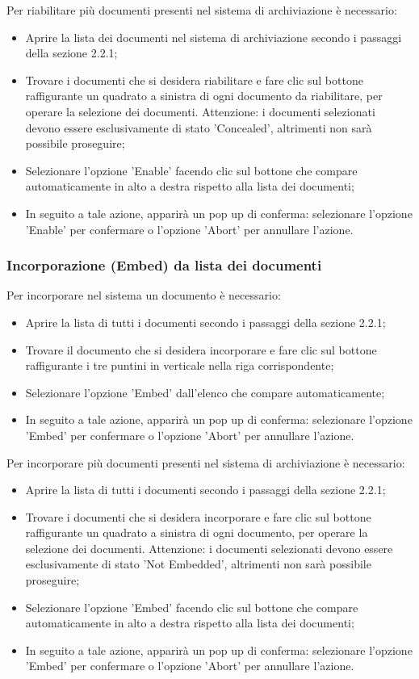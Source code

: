 \documentclass[10pt, a4paper]{article}
\begin{document}
Per riabilitare più documenti presenti nel sistema di archiviazione è necessario:
\begin{itemize}
    \item Aprire la lista dei documenti nel sistema di archiviazione secondo i passaggi della sezione 2.2.1;
    \item Trovare i documenti che si desidera riabilitare e fare clic sul bottone raffigurante un quadrato a sinistra di ogni documento da riabilitare, per operare la selezione dei documenti. Attenzione: i documenti selezionati devono essere esclusivamente di stato 'Concealed', altrimenti non sarà possibile proseguire;
    \item Selezionare l'opzione 'Enable' facendo clic sul bottone che compare automaticamente in alto a destra rispetto alla lista dei documenti; 
    \item In seguito a tale azione, apparirà un pop up di conferma: selezionare l'opzione 'Enable' per confermare o l'opzione 'Abort' per annullare l'azione.
\end{itemize}

\subsubsection{Incorporazione (Embed) da lista dei documenti}
Per incorporare nel sistema un documento è necessario:
\begin{itemize}
    \item Aprire la lista di tutti i documenti secondo i passaggi della sezione 2.2.1;
    \item Trovare il documento che si desidera incorporare e fare clic sul bottone raffigurante i tre puntini in verticale nella riga corrispondente;
    \item Selezionare l'opzione 'Embed' dall'elenco che compare automaticamente;
    \item In seguito a tale azione, apparirà un pop up di conferma: selezionare l'opzione 'Embed' per confermare o l'opzione 'Abort' per annullare l'azione.
\end{itemize}
Per incorporare più documenti presenti nel sistema di archiviazione è necessario:
\begin{itemize}
    \item Aprire la lista di tutti i documenti secondo i passaggi della sezione 2.2.1;
    \item Trovare i documenti che si desidera incorporare e fare clic sul bottone raffigurante un quadrato a sinistra di ogni documento, per operare la selezione dei documenti. Attenzione: i documenti selezionati devono essere esclusivamente di stato 'Not Embedded', altrimenti non sarà possibile proseguire;
    \item Selezionare l'opzione 'Embed' facendo clic sul bottone che compare automaticamente in alto a destra rispetto alla lista dei documenti; 
    \item In seguito a tale azione, apparirà un pop up di conferma: selezionare l'opzione 'Embed' per confermare o l'opzione 'Abort' per annullare l'azione.
\end{itemize}
\end{document}
